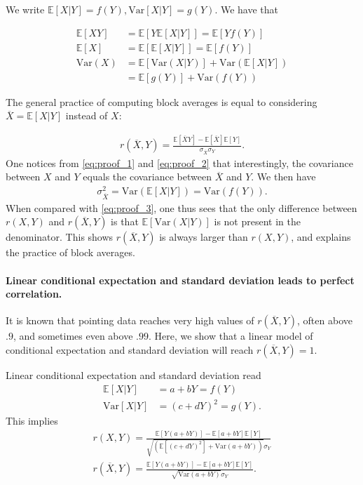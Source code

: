 \documentclass[manuscript,review,anonymous]{acmart}
\begin{document}
We write $\mathbb{E}[X|Y] = f(Y), \text{Var}[X|Y] = g(Y)$. We have that

\begin{align}
	\mathbb{E}[XY] & = \mathbb{E}[Y\mathbb{E}[X|Y]]   =      \mathbb{E}[Yf(Y)]   \label{eq:proof_1}                   \\
	\mathbb{E}[X]  & = \mathbb{E}[\mathbb{E}[X|Y]] = \mathbb{E}[f(Y)]           \label{eq:proof_2}                    \\
	\text{Var}(X)  & = \mathbb{E}[\text{Var}(X|Y)] + \text{Var}(\mathbb{E}[X|Y])                   \label{eq:proof_3} \\
	               & = \mathbb{E}[g(Y)] + \text{Var}(f(Y))
\end{align}

The general practice of computing block averages is equal to considering $\overline{X} = \mathbb{E}[X|Y]$ instead of $X$:

\begin{align}
	r(\overline{X},Y) = \frac{\mathbb{E}[\overline{X}Y] - \mathbb{E}[\overline{X}]\mathbb{E}[Y]}{\sigma_{\overline{X}} \sigma_Y}.
\end{align}
One notices from \autoref{eq:proof_1} and \autoref{eq:proof_2} that interestingly, the covariance between $X$ and $Y$ equals the covariance between $\overline{X}$ and $Y$. We then have
\begin{align}
	\sigma_{\overline{X}}^2 = \text{Var}(\mathbb{E}[X|Y]) = \text{Var}(f(Y)).
\end{align}
When compared with \autoref{eq:proof_3}, one thus sees that the only difference between $r(X,Y)$ and $r(\overline{X},Y)$ is that $\mathbb{E}[\text{Var}(X|Y)]$ is not present in the denominator. This shows $r(\overline{X},Y)$ is always larger than $r(X,Y)$, and explains the practice of block averages.

\paragraph{Linear conditional expectation and standard deviation leads to perfect correlation.}
It is known that pointing data reaches very high values of $r(\overline{X},Y)$, often above $.9$, and sometimes even above $.99$. Here, we show that a linear model of conditional expectation and standard deviation will reach $r(\overline{X},Y) = 1$.

Linear conditional expectation and standard deviation read
\begin{align}
	\mathbb{E}[X|Y] & = a + b Y  = f(Y)     \\
	\text{Var}[X|Y] & = (c + d Y)^2 = g(Y).
\end{align}
This implies
\begin{align}
	r(X,Y)  = \frac{\mathbb{E}[Y(a + bY)] - \mathbb{E}[a + bY]\mathbb{E}[Y] }{\sqrt{(\mathbb{E}[(c + dY)^2] + \text{Var}(a + bY))}\sigma_Y} \\
	r(\overline{X}, Y) = \frac{\mathbb{E}[Y(a + bY)] - \mathbb{E}[a + bY]\mathbb{E}[Y] }{\sqrt{\text{Var}(a + bY)}\sigma_Y}.
\end{align}
\end{document}
